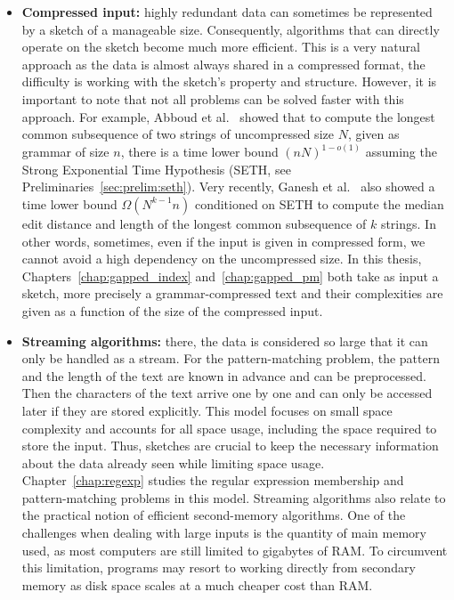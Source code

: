 \begin{itemize}
\item \textbf{Compressed input:} highly redundant data can sometimes be represented by a sketch of a manageable size. 
Consequently, algorithms that can directly operate on the sketch become much more efficient. This is a very natural approach as the data is almost always shared in a compressed format, the difficulty is working with the sketch's property and structure. However, it is important to note that not all problems can be solved faster with this approach. For example, Abboud et al.~\cite{abboud2017fine} showed that to compute the longest common subsequence of two strings of uncompressed size $N$, given as grammar of size $n$, there is a time lower bound $(nN)^{1-o(1)}$ assuming the Strong Exponential Time Hypothesis (SETH, see Preliminaries~\ref{sec:prelim:seth}). 
Very recently, Ganesh et al.~\cite{ganesh2022compression} also showed a time lower bound $\Omega(N^{k-1}n)$ conditioned on SETH to compute the median edit distance and length of the longest common subsequence of $k$ strings.
In other words, sometimes, even if the input is given in compressed form, we cannot avoid a high dependency on the uncompressed size. In this thesis, Chapters~\ref{chap:gapped_index} and~\ref{chap:gapped_pm} both take as input a sketch, more precisely a grammar-compressed text and their complexities are given as a function of the size of the compressed input.
%
\item \textbf{Streaming algorithms:} there, the data is considered so large that it can only be handled as a stream.
For the pattern-matching problem, the pattern and the length of the text are known in advance and can be preprocessed. Then the characters of the text arrive one by one and can only be accessed later if they are stored explicitly. 
This model focuses on small space complexity and accounts for all space usage, including the space required to store the input.
Thus, sketches are crucial to keep the necessary information about the data already seen while limiting space usage.
Chapter~\ref{chap:regexp} studies the regular expression membership and pattern-matching problems in this model.
Streaming algorithms also relate to the practical notion of efficient second-memory algorithms. One of the challenges when dealing with large inputs is the quantity of main memory used, as most computers are still limited to gigabytes of RAM. To circumvent this limitation, programs may resort to working directly from secondary memory as disk space scales at a much cheaper cost than RAM.

\end{itemize}
